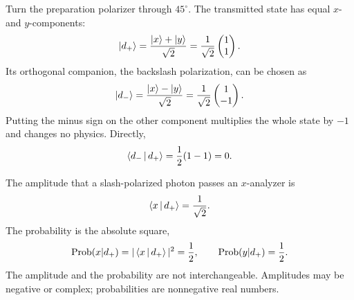 Turn the preparation polarizer through \(45^\circ\). The transmitted state
has equal \(x\)- and \(y\)-components:
\begin{equation}
  \left\lvert d_+\right\rangle
  =\frac{\left\lvert x\right\rangle+\left\lvert y\right\rangle}{\sqrt2}
  =\frac{1}{\sqrt2}
    \begin{pmatrix}1\\1\end{pmatrix}.
  \label{eq:l6-diagonal-plus}
\end{equation}
Its orthogonal companion, the backslash polarization, can be chosen as
\begin{equation}
  \left\lvert d_-\right\rangle
  =\frac{\left\lvert x\right\rangle-\left\lvert y\right\rangle}{\sqrt2}
  =\frac{1}{\sqrt2}
    \begin{pmatrix}1\\-1\end{pmatrix}.
  \label{eq:l6-diagonal-minus}
\end{equation}
Putting the minus sign on the other component multiplies the whole state by
\(-1\) and changes no physics. Directly,
\begin{equation}
  \left\langle d_-\,\middle|\,d_+\right\rangle=\frac12(1-1)=0.
  \label{eq:l6-diagonal-orthogonality}
\end{equation}

The amplitude that a slash-polarized photon passes an \(x\)-analyzer is
\begin{equation}
  \left\langle x\,\middle|\,d_+\right\rangle=\frac{1}{\sqrt2}.
\end{equation}
The probability is the absolute square,
\begin{equation}
  \operatorname{Prob}(x|d_+)
  =|\left\langle x\,\middle|\,d_+\right\rangle|^2=\frac12,
  \qquad
  \operatorname{Prob}(y|d_+)=\frac12.
  \label{eq:l6-diagonal-probabilities}
\end{equation}
The amplitude and the probability are not interchangeable. Amplitudes may
be negative or complex; probabilities are nonnegative real numbers.

